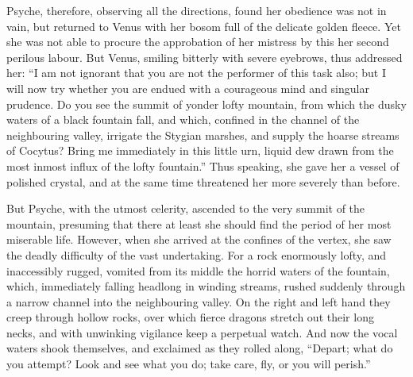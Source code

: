 \documentclass[12pt]{article}
\begin{document}
Psyche, therefore, observing all the directions, found her obedience was not in
vain, but returned to Venus with her bosom full of the delicate golden fleece.
Yet she was not able to procure the approbation of her mistress by this her
second perilous labour. But Venus, smiling bitterly with severe eyebrows, thus
addressed her: ``I am not ignorant that you are not the performer of this task
also; but I will now try whether you are endued with a courageous mind and
singular prudence. Do you see the summit of yonder lofty mountain, from which
the dusky waters of a black fountain fall, and which, confined in the channel
of the neighbouring valley, irrigate the Stygian marshes, and supply the hoarse
streams of Cocytus? Bring me immediately in this little urn, liquid dew drawn
from the most inmost influx of the lofty fountain.'' Thus speaking, she gave
her a vessel of polished crystal, and at the same time threatened her more
severely than before.

But Psyche, with the utmost celerity, ascended to the very summit of the
mountain, presuming that there at least she should find the period of her most
miserable life. However, when she arrived at the confines of the vertex, she
saw the deadly difficulty of the vast undertaking. For a rock enormously
lofty, and inaccessibly rugged, vomited from its middle the horrid waters of
the fountain, which, immediately falling headlong in winding streams, rushed
suddenly through a narrow channel into the neighbouring valley. On the right
and left hand they creep through hollow rocks, over which fierce dragons
stretch out their long necks, and with unwinking vigilance keep a perpetual
watch. And now the vocal waters shook themselves, and exclaimed as they rolled
along, ``Depart; what do you attempt? Look and see what you do; take care, fly,
or you will perish.''
\end{document}
